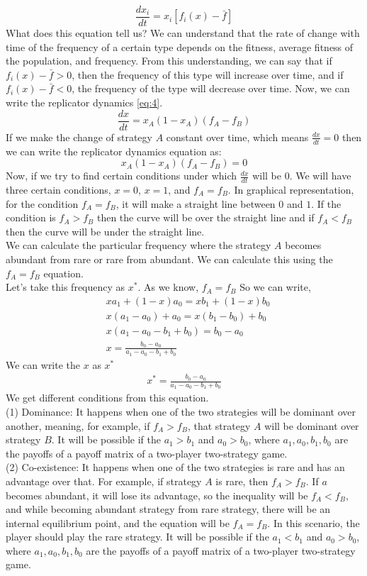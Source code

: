 \documentclass{article}
\begin{document}
\[\frac{dx_i}{dt}=x_i[f_i(x)-\bar{f}]\]
What does this equation tell us? 
We can understand that the rate of change with time of the frequency of a certain type depends on the fitness, average fitness of the population, and frequency. From this understanding, we can say that if $f_i(x)-\bar{f}>0$, then the frequency of this type will increase over time, and if $f_i(x)-\bar{f}<0$, the frequency of the type will decrease over time.
Now, we can write the replicator dynamics \eqref{eq:4}.
\[\frac{dx}{dt}=x_A(1-x_A)(f_A-f_B)\]
If we make the change of strategy $A$ constant over time, which means $\frac{dx}{dt}=0$ then we can write the replicator dynamics equation as:
\[x_A(1-x_A)(f_A-f_B)=0\]
Now, if we try to find certain conditions under which $\frac{dx}{dt}$ will be $0$.
We will have three certain conditions, $x=0$, $x=1$, and $f_A=f_B$.
In graphical representation, for the condition $f_A=f_B$, it will make a straight line between $0$ and $1$. If the condition is $f_A>f_B$ then the curve will be over the straight line and if $f_A<f_B$ then the curve will be under the straight line\citep{Bishop1976}.\\
We can calculate the particular frequency where the strategy $A$ becomes abundant from rare or rare from abundant. We can calculate this using the $f_A=f_B$ equation.\\
Let's take this frequency as $x^*$.
As we know, $f_A=f_B$
So we can write,
\begin{align}
&xa_1+(1-x)a_0 =xb_1+(1-x)b_0 \nonumber\\
&x(a_1-a_0)+a_0=x(b_1-b_0)+b_0 \nonumber\\
&x(a_1-a_0-b_1+b_0)=b_0-a_0 \nonumber\\
&x=\frac{b_0-a_0}{a_1-a_0-b_1+b_0} \nonumber
\end{align}
We can write the $x$ as $x^*$
\begin{align}
x^*=\frac{b_0-a_0}{a_1-a_0-b_1+b_0} \label{eq:5}
\end{align}
We get different conditions from this equation.\\
(1) Dominance: It happens when one of the two strategies will be dominant over another, meaning, for example, if $f_A>f_B$, that strategy $A$ will be dominant over strategy $B$. It will be possible if the $a_1>b_1$ and $a_0>b_0$, where $a_1,a_0,b_1,b_0$ are the payoffs of a payoff matrix of a two-player two-strategy game.\\
(2) Co-existence: It happens when one of the two strategies is rare and has an advantage over that. For example, if strategy $A$ is rare, then $f_A>f_B$. If $a$ becomes abundant, it will lose its advantage, so the inequality will be  $f_A<f_B$, and while becoming abundant strategy from rare strategy, there will be an internal equilibrium point, and the equation will be $f_A=f_B$. In this scenario, the player should play the rare strategy. It will be possible if the $a_1<b_1$ and $a_0>b_0$, where $a_1,a_0,b_1,b_0$ are the payoffs of a payoff matrix of a two-player two-strategy game.\\
\end{document}
